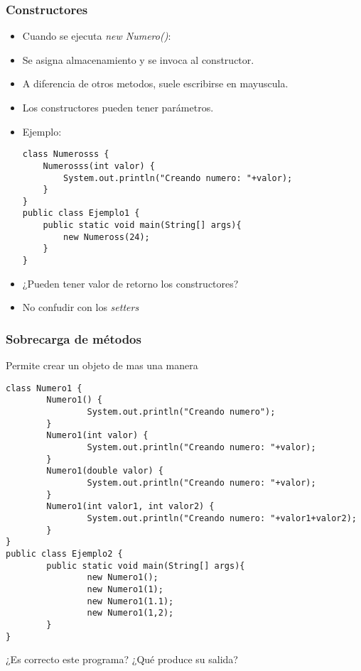 \documentclass{beamer}
\begin{document}
\begin{frame}[fragile]
\frametitle{Constructores}
\begin{itemize}[<+-|alert@+>]
\item Cuando se ejecuta \emph{new Numero()}:
\item Se asigna almacenamiento y se invoca al constructor.
\item A diferencia de otros metodos, suele escribirse en mayuscula.
\item Los constructores pueden tener parámetros.
\item Ejemplo:
\begin{verbatim}
class Numerosss {
    Numerosss(int valor) {
        System.out.println("Creando numero: "+valor);
    }
}    
public class Ejemplo1 {
    public static void main(String[] args){
        new Numeross(24);
    }
}    
\end{verbatim}
\item ¿Pueden tener valor de retorno los constructores?
\item No confudir con los \emph{setters}
\end{itemize}
\pause
\end{frame}

\begin{frame}[fragile]
\frametitle{Sobrecarga de métodos}
Permite crear un objeto de mas una manera
\pause
\begin{scriptsize}
\begin{verbatim}
class Numero1 {
        Numero1() {
                System.out.println("Creando numero");
        }
        Numero1(int valor) {
                System.out.println("Creando numero: "+valor);
        }
        Numero1(double valor) {
                System.out.println("Creando numero: "+valor);
        }
        Numero1(int valor1, int valor2) {
                System.out.println("Creando numero: "+valor1+valor2);
        }
}
public class Ejemplo2 {
        public static void main(String[] args){
                new Numero1();
                new Numero1(1);
                new Numero1(1.1);
                new Numero1(1,2);
        }
}
\end{verbatim}  
\end{scriptsize}  
\pause
¿Es correcto este programa? ¿Qué produce su salida?
\end{frame}
\end{document}
